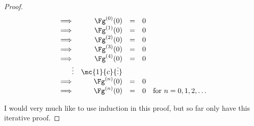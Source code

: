 \begin{proof}
  \[\begin{array}{rrcll}
    \implies&  \Fg^{(0)}(0) &=& 0   \\
    \implies&  \Fg^{(1)}(0) &=& 0   \\
    \implies&  \Fg^{(2)}(0) &=& 0   \\
    \implies&  \Fg^{(3)}(0) &=& 0   \\
    \implies&  \Fg^{(4)}(0) &=& 0   \\
    \vdots  &  \mc{1}{c}{\vdots}    \\
    \implies&  \Fg^{(n)}(0) &=& 0   \\
    \implies&  \Fg^{(n)}(0) &=& 0  & \text{for $n=0,1,2,\ldots$}
  \end{array}\]

  I would very much like to use induction in this proof,
  but so far only have this iterative proof.


\end{proof}
